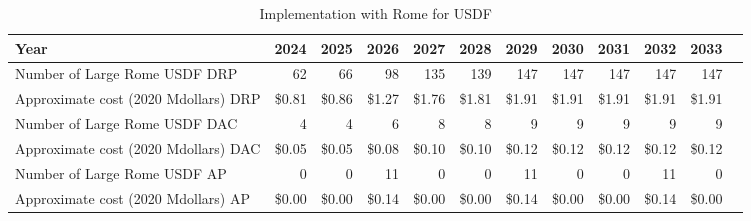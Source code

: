 \tiny \begin{longtable} { |p{}  |r  |r  |r  |r  |r  |r  |r  |r  |r  |r  |r |} 
\caption{Implementation with Rome for USDF \label{tab:opsRomeUSDF}}\\ 
\hline 
\textbf{Year}&\textbf{2024}&\textbf{2025}&\textbf{2026}&\textbf{2027}&\textbf{2028}&\textbf{2029}&\textbf{2030}&\textbf{2031}&\textbf{2032}&\textbf{2033} \\ \hline
{Number of Large Rome USDF DRP}&{62}&{66}&{98}&{135}&{139}&{147}&{147}&{147}&{147}&{147} \\ \hline
{Approximate cost (2020 Mdollars) DRP}&{\$0.81}&{\$0.86}&{\$1.27}&{\$1.76}&{\$1.81}&{\$1.91}&{\$1.91}&{\$1.91}&{\$1.91}&{\$1.91} \\ \hline
{Number of Large Rome USDF DAC}&{4}&{4}&{6}&{8}&{8}&{9}&{9}&{9}&{9}&{9} \\ \hline
{Approximate cost (2020 Mdollars) DAC}&{\$0.05}&{\$0.05}&{\$0.08}&{\$0.10}&{\$0.10}&{\$0.12}&{\$0.12}&{\$0.12}&{\$0.12}&{\$0.12} \\ \hline
{Number of Large Rome USDF AP}&{0}&{0}&{11}&{0}&{0}&{11}&{0}&{0}&{11}&{0} \\ \hline
{Approximate cost (2020 Mdollars) AP}&{\$0.00}&{\$0.00}&{\$0.14}&{\$0.00}&{\$0.00}&{\$0.14}&{\$0.00}&{\$0.00}&{\$0.14}&{\$0.00} \\ \hline
\end{longtable} \normalsize

